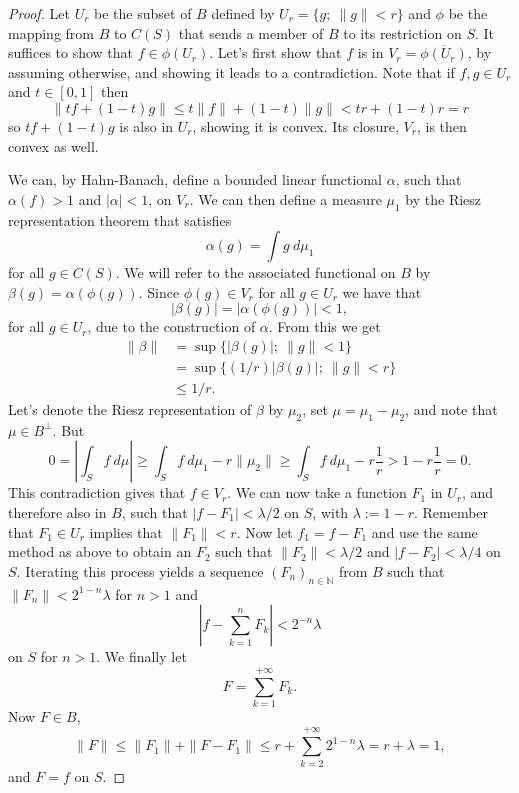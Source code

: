 \documentclass[a4paper,12pt,twoside,BCOR=10mm]{scrbook}
\theoremstyle{definition}
\theoremstyle{definition}
\theoremstyle{definition}
\begin{document}
\begin{proof}
Let $U_r$ be the subset of $B$ defined by $U_r = \{g;\ \|g\| < r\}$ and $\phi$ be the mapping from $B$ to $C(S)$ that sends a member of $B$ to its restriction on $S$.
It suffices to show that $f \in \phi(U_r)$.
Let's first show that $f$ is in $V_r = \overline{\phi(U_r)}$, by assuming otherwise, and showing it leads to a contradiction.
Note that if $f, g \in U_r$ and $t \in [0, 1]$ then
\[
	\|tf + (1 - t)g\| \leq t\|f\| + (1 - t)\|g\| < tr + (1 - t)r = r
\]
so $tf + (1 - t)g$ is also in $U_r$, showing it is convex.
Its closure, $V_r$, is then convex as well.

We can, by Hahn-Banach, define a bounded linear functional $\alpha$, such that $\alpha(f) > 1$ and $|\alpha| < 1$, on $V_r$.
We can then define a measure $\mu_1$ by the Riesz representation theorem that satisfies
\[
	\alpha(g) = \int g\ d\mu_1
\]
for all $g \in C(S)$.
We will refer to the associated functional on $B$ by $\beta(g) = \alpha(\phi(g))$.
Since $\phi(g) \in V_r$ for all $g \in U_r$ we have that
\[
	|\beta(g)| = |\alpha(\phi(g))| < 1,
\]
for all $g \in U_r$,
	due to the construction of $\alpha$.
From this we get
\begin{align*}
	\| \beta \|
	&= \sup \{ |\beta(g)|;\ \|g\| < 1 \}\\
	&= \sup \{ (1/r)|\beta(g)|;\ \|g\| < r \}\\
	&\leq 1/r.
\end{align*}
Let's
	denote the Riesz representation of $\beta$ by $\mu_2$,
	set $\mu = \mu_1 - \mu_2$,
	and note that $\mu \in B^{\bot}$.
But
\[
	0 = \left | \int_S f\ d\mu \right | 
		\geq \int_S f\ d\mu_1 - r\|\mu_2\| 
		\geq \int_S f\ d\mu_1 - r\frac{1}{r}
		> 1 - r \frac{1}{r} = 0.
\]
This contradiction gives that $f \in V_r$.
We can now take a function $F_1$ in $U_r$, and therefore also in $B$, such that $|f - F_1| < \lambda/2$ on $S$, with $\lambda := 1 - r$.
Remember that $F_1 \in U_r$ implies that $\|F_1\| < r$.
Now let $f_1 = f - F_1$ and use the same method as above to obtain an $F_2$ such that $\|F_2\| < \lambda/2$ and $|f - F_2| < \lambda/4$ on $S$.
Iterating this process yields a sequence $(F_n)_{n \in \mathbb{N}}$ from $B$ such that $\|F_n\| < 2^{1 - n}\lambda$ for $n > 1$ and
\[
	\left | f - \sum_{k = 1}^n F_k \right | < 2^{-n}\lambda
\]
on $S$ for $n > 1$.
We finally let 
\[
F = \sum_{k = 1}^{+\infty} F_k.
\]
Now $F \in B$,
\[
	\|F\| \leq \|F_1\| + \|F - F_1\| \leq r + \sum_{k = 2}^{+\infty}2^{1 - n}\lambda = r + \lambda = 1,
\]
and $F = f$ on $S$.
\end{proof}
\end{document}
